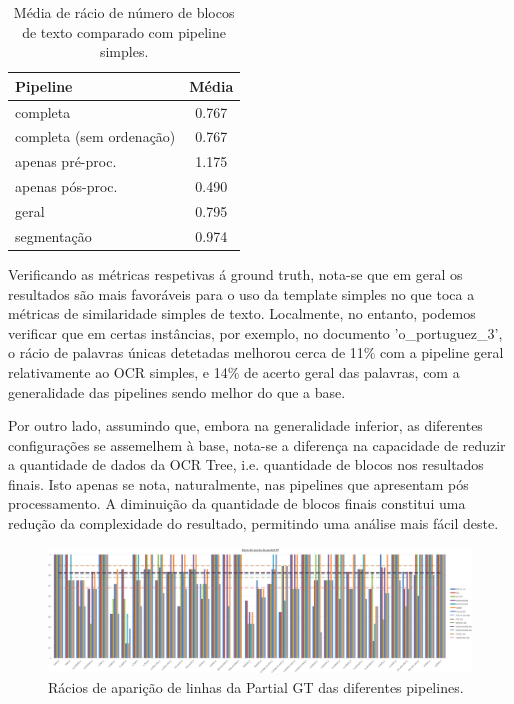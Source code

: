 \begin{table}[H]
	\centering
	\begin{tabular}{|l|c|}
		\hline
		\textbf{Pipeline} & \textbf{Média} \\ \hline
		completa & 0.767 				   \\ \hline
		completa (sem ordenação) & 0.767   \\ \hline
		apenas pré-proc. & 1.175 		   \\ \hline
		apenas pós-proc. & 0.490 		   \\ \hline
		geral & 0.795 					   \\ \hline
		segmentação & 0.974 			   \\ \hline
	\end{tabular}
	\caption{Média de rácio de número de blocos de texto comparado com pipeline simples.}
\end{table}




Verificando as métricas respetivas á ground truth, nota-se que em geral os resultados são mais favoráveis para o uso da template simples no que toca a métricas de similaridade simples de texto. Localmente, no entanto, podemos verificar que em certas instâncias, por exemplo, no documento 'o\_portuguez\_3', o rácio de palavras únicas detetadas melhorou cerca de 11\% com a pipeline geral relativamente ao OCR simples, e 14\% de acerto geral das palavras, com a generalidade das pipelines sendo melhor do que a base.

Por outro lado, assumindo que, embora na generalidade inferior, as diferentes configurações se assemelhem à base, nota-se a diferença na capacidade de reduzir a quantidade de dados da OCR Tree, i.e. quantidade de blocos nos resultados finais. Isto apenas se nota, naturalmente, nas pipelines que apresentam pós processamento. A diminuição da quantidade de blocos finais constitui uma redução da complexidade do resultado, permitindo uma análise mais fácil deste.



\begin{figure}[H]
	\centering
	\hspace*{-2cm}
	\includegraphics[width=1.1\textwidth]{images/resultados/graph_pgt_hit_ratio.png}
	\caption{Rácios de aparição de linhas da Partial GT das diferentes pipelines.}
	\label{fig:graph_pgt_hit_ratio}
\end{figure}


